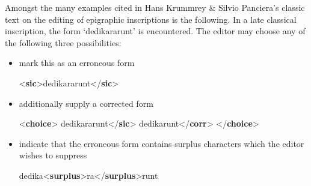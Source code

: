 Amongst the many examples cited in Hans Krummrey \& Silvio Panciera's classic text on the editing of epigraphic inscriptions is the following. In a late classical inscription, the form ‘dedikararunt’ is encountered. The editor may choose any of the following three possibilities:\begin{itemize}
\item mark this as an erroneous form \par\bgroup{}\exampleFont \begin{shaded}\noindent\mbox{}{<\textbf{sic}>}dedikararunt{</\textbf{sic}>}\end{shaded}\egroup\par 
\item additionally supply a corrected form \par\bgroup{}\exampleFont \begin{shaded}\noindent\mbox{}{<\textbf{choice}>}\mbox{}\newline 
{}dedikararunt{</\textbf{sic}>}\mbox{}\newline 
{}dedikarunt{</\textbf{corr}>}\mbox{}\newline 
{</\textbf{choice}>}\end{shaded}\egroup\par 
\item indicate that the erroneous form contains surplus characters which the editor wishes to suppress \par\bgroup{}\exampleFont \begin{shaded}\noindent\mbox{} dedika{<\textbf{surplus}>}ra{</\textbf{surplus}>}runt \end{shaded}\egroup\par 
\end{itemize} \par
